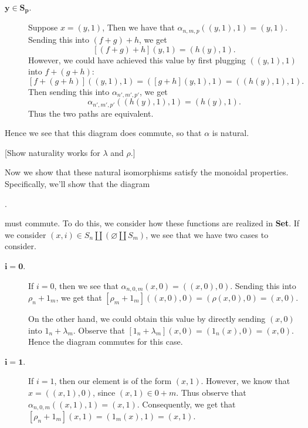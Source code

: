 \begin{example}
\begin{description}
\begin{description}
            \item[$\bm{y \in S_p}$.] Suppose $x = (y, 1)$, Then we have that 
            $\alpha_{n, m, p}((y,1), 1) = (y, 1)$. Sending this into $(f + g)+ h$, we get 
            \[
                [(f + g) + h](y, 1) = (h(y), 1).
            \]
            However, we could have achieved this value by first plugging $((y, 1),1)$ into 
            $f + (g + h)$:
            \[
                [f + (g + h)]((y, 1), 1) = ([g + h](y, 1), 1) = ((h(y), 1), 1).
            \]  
            Then sending this into $\alpha_{n',m',p'}$, we get 
            \[
                \alpha_{n',m',p'}((h(y), 1), 1) = (h(y), 1).
            \]
            Thus the two paths are equivalent.
        \end{description}
        Hence we see that this diagram does commute, so that $\alpha$ is natural. 
    \end{description}
    [Show naturality works for $\lambda$ and $\rho$.]

    Now we show that these natural isomorphisms satisfy the monoidal properties. 
    Specifically, we'll show that the diagram 
    \begin{center}
        .
    \end{center}
    must commute. To do this, we consider how these functions are realized in \textbf{Set}. 
    If we consider $(x, i) \in S_n\amalg(\varnothing \amalg S_m)$, we see that 
    we have two cases to consider. 
    \begin{description}
        \item[$\bm{i = 0}$.]
        If $i = 0$, then we see that $\alpha_{n, 0, m}(x, 0) = ((x, 0), 0)$. Sending 
        this into $\rho_n + 1_m$, we get that $[\rho_m + 1_m]((x, 0), 0) = (\rho(x, 0), 0) = (x, 0)$. 

        On the other hand, we could obtain this value by directly sending $(x, 0)$ into 
        $1_n + \lambda_m$. Observe that $[1_n + \lambda_m](x, 0) = (1_n(x), 0) = (x, 0)$. 
        Hence the diagram commutes for this case. 

        \item[$\bm{i = 1}$.] If $i = 1$, then our element is of the form 
        $(x, 1)$. However, we know that $x = ((x, 1), 0)$, since $(x, 1) \in 0 + m$. 
        Thus observe that $\alpha_{n, 0, m}((x, 1), 1) = (x, 1)$. Consequently, 
        we get that $[\rho_n + 1_m](x, 1) = (1_m(x), 1) = (x, 1)$. 


\end{description}
\end{example}
